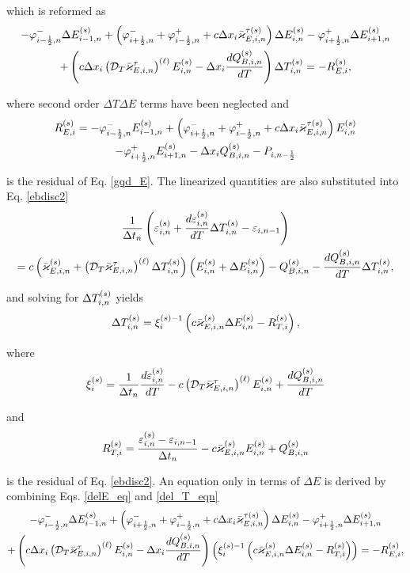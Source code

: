 	which is reformed as
	\begin{multline}
		- \Dilnm\debillnsv + \pr{\Dirnm + \Dilnp + c\delxi\kapebin^{\tau\pr{s}}}\debinsv - \Dirnp\debirrnsv \\
		+\pr{ c\delxi \pr{\fd \kapebin^{\tau}}^{\pr{\ell}}\ebinsv- \delxi \frac{d\qbinsv}{dT}}\dtinsv = -R_{E,i}^{\pr{s}}, \label{delE_eq}
	\end{multline}
	
	where second order $\Delta T \Delta E$ terms have been neglected and 
	\begin{multline}
		R_{E,i}^{\pr{s}} = - \Dilnm\ebilnsv + \pr{\Dirnm + \Dilnp + c\delxi\kapebin^{\tau\pr{s}}}\ebinsv \\ - \Dirnp\ebirnsv - \delxi \qbinsv - P_{i,n-\frac{1}{2}} \label{Eres}
	\end{multline}
	
	is the residual of Eq. \eqref{gqd_E}. The linearized quantities are also substituted into Eq. \eqref{ebdisc2}
	\begin{multline}
		\frac{1}{\delt_n}\pr{\varepsilon_{i,n}^{\pr{s}} + \frac{d\varepsilon_{i,n}^{\pr{s}}}{dT}\dtinsv - \varepsilon_{i,n-1}}\\ = c\pr{\kapebin^{\pr{s}} + \pr{\fd \kapebin^{\tau}}^{\pr{\ell}}\dtinsv}\pr{\ebinsv + \debinsv} - \qbinsv - \frac{d\qbinsv}{dT}\dtinsv,
	\end{multline}
	
	and solving for $\dtinsv$ yields
	\begin{align}
		\dtinsv = \xi_{i}^{\pr{s}-1}\pr{c\kapebin^{\pr{s}}\debinsv - R_{T,i}^{\pr{s}}}, \label{del_T_eqn}
	\end{align}
	
	where
	\begin{equation}
		\xi_{i}^{\pr{s}} = \frac{1}{\delt_n}\frac{d\varepsilon_{i,n}^{\pr{s}}}{dT} - c\pr{\fd \kapebin^{\tau}}^{\pr{\ell}}\ebinsv + \frac{d\qbinsv}{dT}
	\end{equation}
	
	and 
	\begin{equation}
		R_{T,i}^{\pr{s}} = \frac{\varepsilon_{i,n}^{\pr{s}} - \varepsilon_{i,n-1}}{\delt_n} - c\kapebin^{\pr{s}}\ebinsv + \qbinsv
	\end{equation}
	
	is the residual of Eq. \eqref{ebdisc2}. An equation only in terms of $\Delta E$ is derived by combining Eqs. \eqref{delE_eq} and \eqref{del_T_eqn} 
	\begin{multline}
		- \Dilnm\debillnsv + \pr{\Dirnm + \Dilnp + c\delxi\kapebin^{\tau\pr{s}}}\debinsv - \Dirnp\debirrnsv \\ +\pr{ c\delxi \pr{\fd \kapebin^{\tau}}^{\pr{\ell}}\ebinsv- \delxi \frac{d\qbinsv}{dT}}\pr{\xi_{i}^{\pr{s}-1}\pr{c\kapebin^{\pr{s}}\debinsv - R_{T,i}^{\pr{s}}}} = -R_{E,i}^{\pr{s}}, \label{delE_eq2}
	\end{multline}
	
